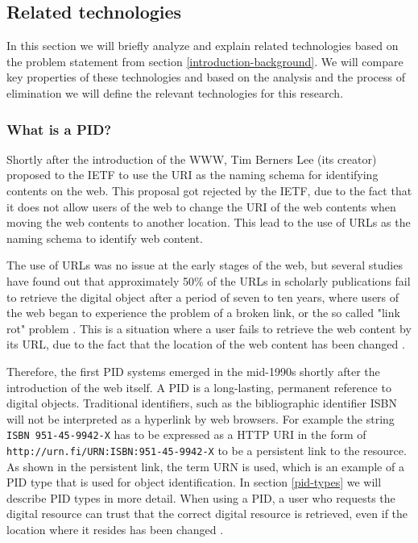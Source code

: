 \subsection{Related technologies}
In this section we will briefly analyze and explain related technologies based on the problem statement from section \ref{introduction-background}. We will compare key properties of these technologies and based on the analysis and the process of elimination we will define the relevant technologies for this research.

\subsubsection{What is a PID?}\label{pid-intr}
Shortly after the introduction of the WWW, Tim Berners Lee (its creator) proposed to the IETF to use the URI as the naming schema for identifying contents on the web. This proposal got rejected by the IETF, due to the fact that it does not allow users of the web to change the URI of the web contents when moving the web contents to another location. This lead to the use of URLs as the naming schema to identify web content. 
 
The use of URLs was no issue at the early stages of the web, but several studies have found out that approximately 50\% of the URLs in scholarly publications fail to retrieve the digital object after a period of seven to ten years, where users of the web began to experience the problem of a broken link, or the so called "link rot" problem \cite{rot-link1, rot-link2}. This is a situation where a user fails to retrieve the web content by its URL, due to the fact that the location of the web content has been changed \cite{icn-bd, ark-id}. 

Therefore, the first PID systems emerged in the mid-1990s shortly after the introduction of the web itself. A PID is a long-lasting, permanent reference to digital objects. Traditional identifiers, such as the bibliographic identifier ISBN will not be interpreted as a hyperlink by web browsers. For example the string \texttt{ISBN 951-45-9942-X} has to be expressed as a HTTP URI in the form of \texttt{http://urn.fi/URN:ISBN:951-45-9942-X} to be a persistent link to the resource. As shown in the persistent link, the term URN is used, which is an example of a PID type that is used for object identification. In section \ref{pid-types} we will describe PID types in more detail. When using a PID, a user who requests the digital resource can trust that the correct digital resource is retrieved, even if the location where it resides has been changed \cite{pid-oview}.

